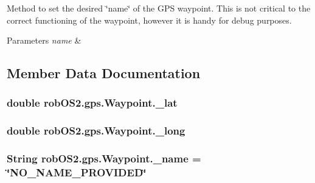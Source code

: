 \label{classrob_o_s2_1_1gps_1_1_waypoint_ab1defbfaa7d8c02eca311f7daa2df27b}
Method to set the desired \char`\"{}name\char`\"{} of the GPS waypoint. This is not critical to the correct functioning of the waypoint, however it is handy for debug purposes. 
\begin{DoxyParams}{Parameters}
{\em name} & \\
\hline
\end{DoxyParams}


\subsection{Member Data Documentation}
\hypertarget{classrob_o_s2_1_1gps_1_1_waypoint_aa71f1baadde6afe8aa751fc8470b5875}{
\subsubsection[{\_\-lat}]{\setlength{\rightskip}{0pt plus 5cm}double {\bf robOS2.gps.Waypoint.\_\-lat}}}
\label{classrob_o_s2_1_1gps_1_1_waypoint_aa71f1baadde6afe8aa751fc8470b5875}
\hypertarget{classrob_o_s2_1_1gps_1_1_waypoint_a1a1d6cacf8516f9f06ecd48b2c467180}{
\subsubsection[{\_\-long}]{\setlength{\rightskip}{0pt plus 5cm}double {\bf robOS2.gps.Waypoint.\_\-long}}}
\label{classrob_o_s2_1_1gps_1_1_waypoint_a1a1d6cacf8516f9f06ecd48b2c467180}
\hypertarget{classrob_o_s2_1_1gps_1_1_waypoint_a9858d8ec37deed55a6456eba501591c8}{
\subsubsection[{\_\-name}]{\setlength{\rightskip}{0pt plus 5cm}String {\bf robOS2.gps.Waypoint.\_\-name} = \char`\"{}NO\_\-NAME\_\-PROVIDED\char`\"{}}}

